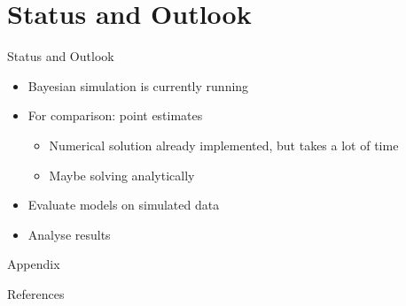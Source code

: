 \documentclass{beamer}
\begin{document}
    \section{Status and Outlook}
    \begin{frame}{Status and Outlook}
        \begin{itemize}
            \item Bayesian simulation is currently running
            \item For comparison: point estimates
            \begin{itemize}
                \item Numerical solution already implemented, but takes a lot of time
                \item Maybe solving analytically
            \end{itemize}
            \item Evaluate models on simulated data
            \item Analyse results
        \end{itemize}
    \end{frame}
    
    \appendix
    
    \begin{frame}[standout]{}
        \center Appendix
    \end{frame}
    
    \begin{frame}[allowframebreaks]{References}
    
      
      
    
    \end{frame}
    
\end{document}
